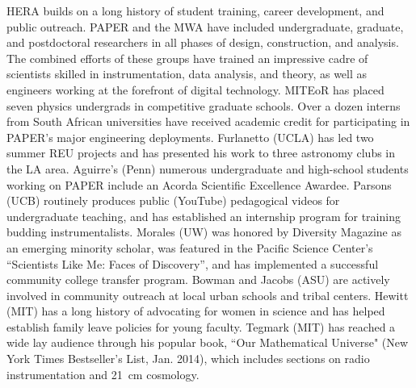 \documentclass[preprint]{aastex}
\begin{document}
HERA builds on a long history of student training, career development, and public outreach.
PAPER and the MWA have
included undergraduate, graduate, and postdoctoral researchers in all
phases of design, construction, and analysis.  The combined efforts of these
groups have trained an impressive cadre of scientists skilled in
instrumentation, data analysis, and theory, as well as engineers working at the
forefront of digital technology.
MITEoR has placed seven physics undergrads 
in competitive graduate schools. Over a dozen interns from South African
universities have received academic credit for participating in 
PAPER's major engineering deployments.
 Furlanetto (UCLA)
has led two summer REU projects and has
presented his work to three astronomy clubs in the LA area. %
Aguirre's (Penn)
numerous undergraduate and high-school students working on PAPER
include an Acorda Scientific Excellence Awardee.
Parsons (UCB) routinely produces
public (YouTube) pedagogical videos for undergraduate teaching, and has established
an internship program for training budding instrumentalists.
Morales (UW) was honored by Diversity Magazine as an 
emerging minority scholar, was featured in the Pacific Science
Center's ``Scientists Like Me: Faces of Discovery'', and has
implemented a successful community college transfer program. 
Bowman and Jacobs (ASU) are actively involved in community outreach at
local urban schools and tribal centers. Hewitt (MIT) has a long history of advocating
for women in science and has helped establish
family leave policies for young faculty.
Tegmark (MIT) has reached a wide lay audience through his popular book,
``Our Mathematical Universe" (New York Times Bestseller's List, Jan. 2014),
which includes sections on radio instrumentation and 21~cm cosmology.

\end{document}
